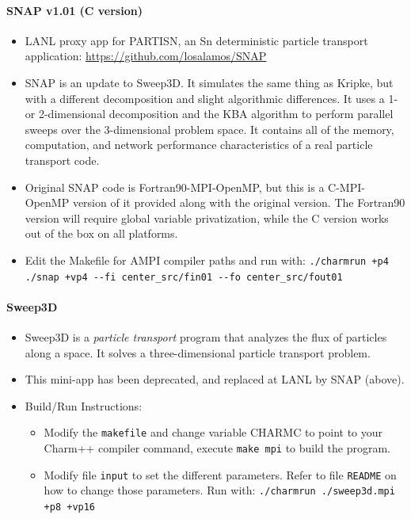 \documentclass[10pt]{article}
\begin{document}
\paragraph{SNAP v1.01 (C version)}
    \begin{itemize}
    \item
      LANL proxy app for PARTISN, an Sn deterministic particle transport
      application: \url{https://github.com/losalamos/SNAP}
    \item
      SNAP is an update to Sweep3D. It simulates the same thing as
      Kripke, but with a different decomposition and slight algorithmic
      differences. It uses a 1- or 2-dimensional decomposition and the
      KBA algorithm to perform parallel sweeps over the 3-dimensional
      problem space. It contains all of the memory, computation, and
      network performance characteristics of a real particle transport
      code.
    \item
      Original SNAP code is Fortran90-MPI-OpenMP, but this is a
      C-MPI-OpenMP version of it provided along with the original
      version. The Fortran90 version will require global variable
      privatization, while the C version works out of the box on all
      platforms.
    \item
      Edit the Makefile for AMPI compiler paths and run with: \texttt{./charmrun
      +p4 ./snap +vp4 -\/-fi center\_src/fin01 -\/-fo center\_src/fout01}
    \end{itemize}

\paragraph{Sweep3D}
    \begin{itemize}
    \item
      Sweep3D is a \emph{particle transport} program that analyzes the
      flux of particles along a space. It solves a three-dimensional
      particle transport problem.
    \item
      This mini-app has been deprecated, and replaced at LANL by SNAP
      (above).
    \item
      Build/Run Instructions:
      \begin{itemize}
      \item
        Modify the \texttt{makefile} and change variable CHARMC to point
        to your Charm++ compiler command, execute \texttt{make mpi} to
        build the program.
      \item
        Modify file \texttt{input} to set the different parameters. Refer
        to file \texttt{README} on how to change those parameters.
        Run with: \texttt{./charmrun ./sweep3d.mpi +p8 +vp16}
      \end{itemize}
    \end{itemize}
\end{document}
